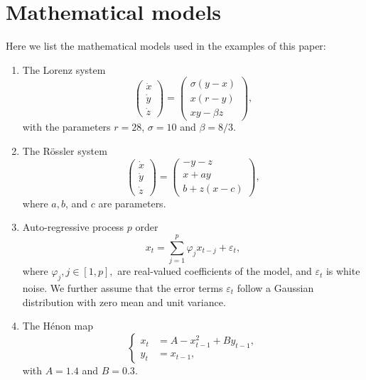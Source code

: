 \appendix
\section{Mathematical models}
Here we list the mathematical models used in the examples of this paper: 

\begin{enumerate}
\item The Lorenz system \cite{Lorenz1963}
\begin{equation}
\left(\begin{array}{c}\dot{x}\\ \dot{y}\\ \dot{z}\end{array}\right)=\left(\begin{array}{c}\sigma(y-x) \\ x(r-y)\\ xy-\beta z \end{array}\right), 
\label{eqlorenz}
\end{equation}
with the parameters $r=28$, $\sigma=10$ and $\beta=8/3$. 

\item The R\"ossler system \cite{Roessler1976}
\begin{equation}
\left( \begin{array}{c}\dot{x}\\ \dot{y}\\ \dot{z}\end{array} \right) = \left( \begin{array}{c} -y-z\\ x+ay\\ b+z(x-c) \end{array} \right),
\label{eq:roessler}
\end{equation}
where $a, b$, and $c$ are parameters. 

\item Auto-regressive process $p$ order
\begin{equation} \label{def:AR}
x_t = \sum_{j=1}^{p}\varphi_j x_{t-j} + \varepsilon_t, 
\end{equation}
where $\varphi_j, j \in [1, p],$ are real-valued coefficients of the model, and $\varepsilon_t$ is white noise. We further assume that the error terms $\varepsilon_t$ follow a Gaussian distribution with zero mean and unit variance. 

\item The H\'enon map
\begin{equation} \label{eq:henon}
 \left \{ \begin{aligned}
x_t &= A - x_{t-1}^2 + B y_{t-1}, \\
y_t &= x_{t-1},
\end{aligned}
\right.
\end{equation}
with $A=1.4$ and $B=0.3$. 


\end{enumerate}
